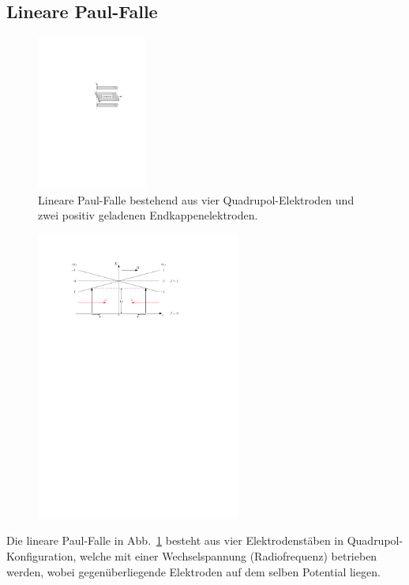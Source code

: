 \documentclass[twocolumn]{revtex4}
\begin{document}
\subsection{Lineare Paul-Falle}
\begin{figure}[h]
	\centering
	\includegraphics[width=0.32\textwidth]{./figures/lineare_paulfalle.pdf}
	\caption{Lineare Paul-Falle  bestehend aus vier Quadrupol-Elektroden und zwei positiv geladenen Endkappenelektroden.}
	\label{fig:paulfalle}
\end{figure}
\begin{figure}[tb!]
	\centering
	\includegraphics[width=0.6\textwidth]{./figures/mot_gesamt.pdf}
	\caption{}
	\label{fig:mot}
\end{figure}
Die lineare Paul-Falle in Abb.~\ref{fig:paulfalle} besteht aus vier Elektrodenstäben in Quadrupol-Konfiguration, welche mit einer Wechselspannung (Radiofrequenz) betrieben werden, wobei gegenüberliegende Elektroden auf dem selben Potential liegen.
\end{document}

